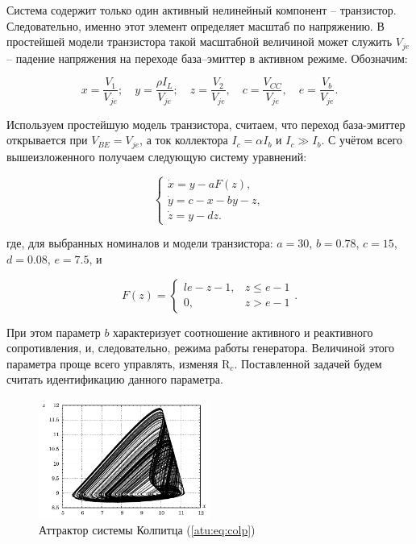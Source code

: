 \documentclass[a4paper,12pt]{article}
\begin{document}
Система содержит только один активный нелинейный компонент -- транзистор.
Следовательно, именно этот элемент определяет
масштаб по напряжению. В простейшей модели транзистора
такой масштабной величиной может служить
$V_{je}$ -- падение напряжения на переходе база--эмиттер
в активном режиме. Обозначим:

\[
  x = \frac{V_{1}}{V_{je}} ; \quad
  y = \frac{\rho I_L}{V_{je}} ; \quad
  z = \frac{V_{2}}{V_{je}}, \quad
  c = \frac{V_{CC}}{V_{je}}, \quad
  e =  \frac{V_{b}}{V_{je}}.
\]

Используем простейшую модель транзистора, считаем, что переход
база-эмиттер открывается при $V_{BE} = V_{je}$,
а ток коллектора $I_c = \alpha I_b$ и $ I_c \gg I_b$.
С учётом всего вышеизложенного получаем следующую систему уравнений:

\begin{equation}
\label{atu:eq:colp}
\begin{cases}
  \dot{x} = y - a F(z), \\
  \dot{y} = c - x - by - z, \\
  \dot{z} = y - d z.
\end{cases}
\end{equation}

\noindent
где, для выбранных номиналов и модели транзистора:
$ a = 30$, $b = 0.78$, $c=15$, $d=0.08$, $e=7.5$,
и

\[
F(z) =
\begin{cases}{l}
  e-z-1, & z \le e-1  \\
  0,     & z  >  e-1
\end{cases}.
\]

При этом параметр $b$ характеризует соотношение
активного и реактивного сопротивления,
и, следовательно, режима работы генератора.
Величиной этого параметра проще всего управлять,
изменяя $\mathrm{R}_c$.
Поставленной задачей будем считать идентификацию
данного параметра.


%

\begin{figure}[htb!]
\centerline{\includegraphics[width=0.5\textwidth]{p/cha/colp/colp_phase.pdf} }
\caption{Аттрактор системы Колпитца (\ref{atu:eq:colp})}
\label{atu:f:colp_phase}
\end{figure}
\end{document}
